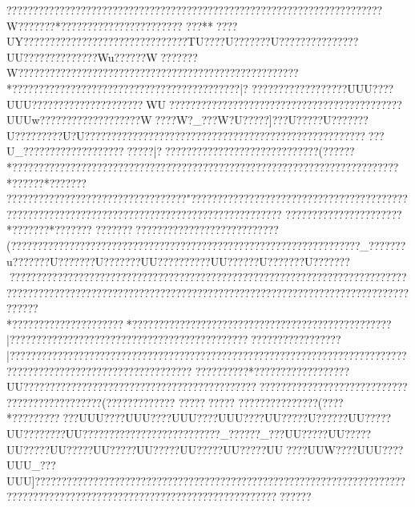 {{{{{{{{{{{{{{{{{{{{{{{{{{{{{{{{{{{{{{{{{{{{{{{{{{{{{{{{{{{{{{{{{{{{{{{{{{{{{{{{{{{{{{{{{{{{{{{{{{{{{{{{{{{{{{{{{{{{{{{{{{{{{{{{{{{{{{{{{{{{{{{{{{{{{{{{{{{{{{{{{{{{{{{{{{{{{{{{{{{{{{{{{{{{{{{{{{{{{{{{{{{{{{{{{{{{{{{{{{{{{{{{{{{{{{{{{{{{{{{{{{{{{{{{{{{{{{{{{{{{{{{{{{{{{{{{{{{{{{{{{{{{{{{{{{{{{{{{{{{{{{{{{{{{{{{{{{{{{{{{{{{{{{{{{{{{{{{{{{{{{{{{{{{{{{{{{{{{{{{{{{{{{{{{{{{{{{{{{{{{{{{{{{{{{{{{{{{{{{{{{{{{{{{{{{{{{{{{{{{{{{{{{{{{{{{{{{{{{{{{{{{{{{{{{{{{{{{{{{{{{{{{{{{{{{{{{{{{{{{{{{{{{{{{{{{{{{{{{{{{{{{{{{{{{{{{{{{{{{{{{{{{{{{{{{{{{{{{{{{{{{{{{{{{{{{{{{{{{{{{{{{{{{{{{{{{{{{{{{{{{{{{{{{{{{{{{{{{{{{{{{{{{{{{{{{{{{{{{{{{{{{{{{{{{{{{{{{{{{{{{{{{{{{{{{{{{{{{{{{{{{{{{{{{{{{{{{{{{{{{{{{{{{{{{{{{{{{{{{{{{{{{{{{{{{{{{{{{{{{{{{{{{{{{{{{{{{{{{{{{{{{{{{{{{{{{{{{{{{{{{{{{{{{{{{{{{{{{{{{{{{{{{{{{{{{{{{{{{{{{{{{{{{{{{{{{{{{{{{{{{{{{{{{{{{{{{{{{{{{{{{{{{{{{{{{{{{{{{{{{{{{{{{{{{{{{{{{{{{{{{{{{{{{{{{{{{{{{{{{{{{{{{{{{{{{{{{{{{{{{{{{{{{{{{{{{{{{{{{{{{{{{{{{{{{{{{{{{{{{{{{{{{{{{{{{{{{{{{{{{{{{{{{{{{{{{{{{{{{{{{{{{{{{{{{{{{{{{{{{{{{{{{{{{{{{{{{{{{{{{{{{{{{{{{{{{{{{{{{{{{{{{{{{{{{{{{{{{{{{{{{{{{{{{{{{{{{{{{{{{{{{{{{{{{{{{{{{{{{{{{{{{{{{{{{{{{{{{{{{{{{{{{{{{??????????????????????????????????????????????????????????????{?????????W???????*??????????????? ?????{? ??
??{?** ????UY??????    ????    ???????????   ?????   ?????  TU????U???????U???????????????UU??????????????Wu??????W???????W?????????????????????????????????????????????????????*????????????????????????????????????{???????|?  
?{?????????{???????{?UUU???{?UUU???{?????{???????{?????{?WU??{???????{???????{?????{?{???????{???????{???????{?UUUw{?{?????{?????{?{?????{?{?W??{?{?W?_?{?{?W?U?{?{???]?{?{?U???{?{?U???{?{???U?{?{?    {?{?    {?{?    {?{?U?U?{?{?????{?{?????{?{?????{?{?????{?{?????{?{?????{?{?????{?{?????{?{??? ??{?U_????{???????{???????{??????|? ?????????????????????????????(??????* ??????????????????????????????????????? ??????? ??????? ??????? ??????? ??????* ??????* ???????
??????????????  ??????  ??????????????" ??????? ??????? ??????????????????????????????????????????????????????????????????????????????? ??????? ???????????????*???????*??????? ?????????????? ??????  ??????? ???????(??????? ??????? ????????????????????????????????????????????????????_???????u???????U???????U???????UU??????    ????UU??????U???????U????????????????????????????????????????????????????????????????????????????????????????????????????????????????????????????????????????????????????????????????????*?????????????????????*????{???????{?????{???????{???????{???????{?????{???????|???????{?????????{?????{?????????{???????{???????{??????{???????{?????|?????????{???????{???????{???????{???????{???????{?????{?????{?{?????{?{???????{?????{?{?????{?{???????{?????{???????{???????{????
??{???? ??{??*  ??{???????{?????????UU????????????????????{???????{?????{??????????????????? ???????????????????????????????????????(??????? ??????
 ?????  ?????
  ??????  ?????   ????(   ????*   ?????   ????   ???UUU????UUU????UUU????UUU????UU?????U??????UU?????UU????????UU??????????????????????????_??????_???UU?????UU?????UU?????UU?????UU?????UU?????UU?????UU?????UU????UUW????UUU????UUU_???UUU]????    ????  ???????   ?????   ??????  ??????  ??????? ??????? ????????????????????????????????????????????????????????????????????????????????? }}}}}}}}}}}}}}}}}}}}}}}}}}}}}}}}}}}}}}}}}}}}}}}}}}}}}}}}}}}}}}}}}}}}}}}}}}}}}}}}}}}}}}}}}}}}}}}}}}}}}}}}}}}}}}}}}}}}}}}}}}}}}}}}}}}}}}}}}}}}}}}}}}}}}}}}}}}}}}}}}}}}}}}}}}}}}}}}}}}}}}}}}}}}}}}}}}}}}}}}}}}}}}}}}}}}}}}}}}}}}}}}}}}}}}}}}}}}}}}}}}}}}}}}}}}}}}}}}}}}}}}}}}}}}}}}}}}}}}}}}}}}}}}}}}}}}}}}}}}}}}}}}}}}}}}}}}}}}}}}}}}}}}}}}}}}}}}}}}}}}}}}}}}}}}}}}}}}}}}}}}}}}}}}}}}}}}}}}}}}}}}}}}}}}}}}}}}}}}}}}}}}}}}}}}}}}}}}}}}}}}}}}}}}}}}}}}}}}}}}}}}}}}}}}}}}}}}}}}}}}}}}}}}}}}}}}}}}}}}}}}}}}}}}}}}}}}}}}}}}}}}}}}}}}}}}}}}}}}}}}}}}}}}}}}}}}}}}}}}}}}}}}}}}}}}}}}}}}}}}}}}}}}}}}}}}}}}}}}}}}}}}}}}}}}}}}}}}}}}}}}}}}}}}}}}}}}}}}}}}}}}}}}}}}}}}}}}}}}}}}}}}}}}}}}}}}}}}}}}}}}}}}}}}}}}}}}}}}}}}}}}}}}}}}}}}}}}}}}}}}}}}}}}}}}}}}}}}}}}}}}}}}}}}}}}}}}}}}}}}}}}}}}}}}}}}}}}}}}}}}}}}}}}}}}}}}}}}}}}}}}}}}}}}}}}}}}}}}}}}}}}}}}}}}}}}}}}}}}}}}}}}}}}}}}}}}}}}}}}}}}}}}}}}}}}}}}}}}}}}}}}}}}}}}}}}}}}}}}}}}}}}}}}}}}}}}}}}}}}}}}}}}}}}}}}}}}}}}}}}}}}}}}}}}}}}}}}}}}}}}}}}}}}}}}}}}}}}}}}}}}}}}}}}}}}}}}}}}}}}}}}}}}}}}}}}}}}}}}}}}}}}}}}}}}}}}}}}}}}}}}}}}}}}}}}}}}}}}}}}}}}}}}}}}}}}}}}}}}}}}}}}}}}}}}}}}}}}}}}}}}}}}}}}}}}}}}}}}}}}}}}}}}}}}}}}}}}}}}}}}}}}}}}}}}}}}}}}}}}}}}}}}}}}}}}}}}}}}}}}}}}}}}}}}}}}}}}}}}}}}}}}}}}}}}}}}}}}}}}}}}}}}}}}}}}}}}}}}}}}}}}}}}}}}}}}}}}}}}}}}}}}}}}}}}}}}}}}}}}

